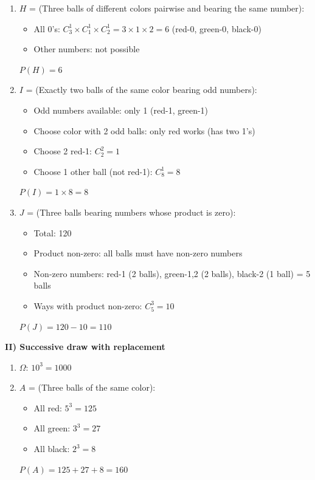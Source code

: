 \documentclass[12pt]{article}
\begin{document}
\begin{correctionbox}
\begin{enumerate}
    \item $H$ = (Three balls of different colors pairwise and bearing the same number):
    \begin{itemize}
        \item All 0's: $C_3^1 \times C_1^1 \times C_2^1 = 3 \times 1 \times 2 = 6$ (red-0, green-0, black-0)
        \item Other numbers: not possible
    \end{itemize}
    $P(H) = 6$
    
    \item $I$ = (Exactly two balls of the same color bearing odd numbers):
    \begin{itemize}
        \item Odd numbers available: only 1 (red-1, green-1)
        \item Choose color with 2 odd balls: only red works (has two 1's)
        \item Choose 2 red-1: $C_2^2 = 1$
        \item Choose 1 other ball (not red-1): $C_8^1 = 8$
    \end{itemize}
    $P(I) = 1 \times 8 = 8$
    
    \item $J$ = (Three balls bearing numbers whose product is zero):
    \begin{itemize}
        \item Total: 120
        \item Product non-zero: all balls must have non-zero numbers
        \item Non-zero numbers: red-1 (2 balls), green-1,2 (2 balls), black-2 (1 ball) = 5 balls
        \item Ways with product non-zero: $C_5^3 = 10$
    \end{itemize}
    $P(J) = 120 - 10 = 110$
\end{enumerate}

\textbf{II) Successive draw with replacement}

\begin{enumerate}
    \item $\Omega$: $10^3 = 1000$
    
    \item $A$ = (Three balls of the same color):
    \begin{itemize}
        \item All red: $5^3 = 125$
        \item All green: $3^3 = 27$
        \item All black: $2^3 = 8$
    \end{itemize}
    $P(A) = 125 + 27 + 8 = 160$
    

\end{enumerate}
\end{correctionbox}
\end{document}
